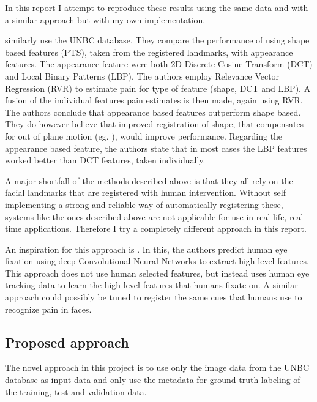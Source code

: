 \documentclass[Main]{subfiles}
\begin{document}
		In this report I attempt to reproduce these results using the same data and with a similar approach but with my own implementation.


		 \cite{Kaltwang2012} similarly use the UNBC database.
		They compare the performance of using shape based features (PTS), taken from the registered landmarks, with appearance features.
		The appearance feature were both 2D Discrete Cosine Transform (DCT) and Local Binary Patterns (LBP).
		The authors employ Relevance Vector Regression (RVR) to estimate pain for type of feature (shape, DCT and LBP).
		A fusion of the individual features pain estimates is then made, again using RVR.
		The authors conclude that appearance based features outperform shape based.
		They do however believe that improved registration of shape, that compensates for out of plane motion (eg. \cite{Rudovic2011}), would improve performance.
		Regarding the appearance based feature, the authors state that in most cases the LBP features worked better than DCT features, taken individually.

		A major shortfall of the methods described above is that they all  rely on the facial landmarks that are registered with human intervention.
		Without self implementing a strong and reliable way of automatically registering these, systems like the ones described above are not applicable for use in real-life, real-time applications.
		Therefore I try a completely different approach in this report.

		An inspiration for this approach is  \cite{Shen2012a}.
		In this, the authors predict human eye fixation using deep Convolutional Neural Networks to extract high level features. 
		This approach does not use human selected features, but instead uses human eye tracking data to learn the high level features that humans fixate on.
		A similar approach could possibly be tuned to register the same cues that humans use to recognize pain in faces.


	\subsection{Proposed approach} %
		\label{sub:proposed_approach}
		The novel approach in this project is to use only the image data from the UNBC database as input data and only use the metadata for ground truth labeling of the training, test and validation data.
\end{document}
